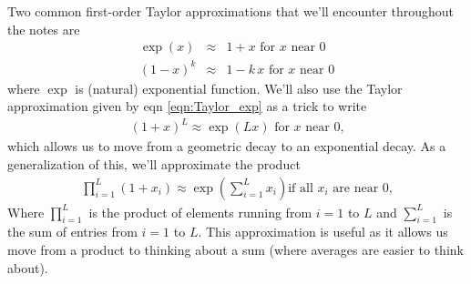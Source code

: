 Two common first-order Taylor approximations that we'll encounter
throughout the notes are
\begin{eqnarray}
\exp(x)&\approx &1+x \mbox{ for $x$ near $0$}  \label{eqn:Taylor_exp}\\
(1-x)^k &\approx & 1-k\,x \mbox{ for $x$ near $0$}
\end{eqnarray}
where $\exp$ is (natural) exponential function. We'll also use the Taylor approximation given by eqn
 \eqref{eqn:Taylor_exp} as a trick to write
\begin{eqnarray}
     (1+x)^L \approx  \exp\left( L x\right)  \mbox{ for $x$ near $0$,} \label{eqn:Taylor_geo} 
\end{eqnarray}
which allows
 us to move from a geometric decay to an exponential decay. As a
 generalization of this, we'll approximate the product 
 \begin{eqnarray}
   \prod_{i=1}^L (1+x_i) \approx  \exp\left( \sum_{i=1}^L x_i\right)
                                   \mbox{if all $x_i$ are near $0$,} \label{eqn:Taylor_prod} 
 \end{eqnarray}
Where $\prod_{i=1}^L$ is the product of elements running from $i=1$ to $L$ and
$\sum_{i=1}^L$ is the sum of entries from  $i=1$ to $L$. This
approximation is useful as it allows us move from a product to thinking about
a sum (where averages are easier to think about). 

